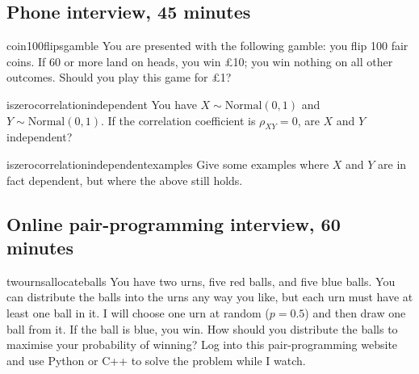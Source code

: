 \documentclass[a4paper]{article}
\begin{document}
\clearpage




\clearpage
\subsection{Phone interview, 45 minutes}
\begin{question}{coin100flipsgamble}
You are presented with the following gamble: you flip 100 fair coins.
If 60 or more land on heads, you win \pounds 10; you win nothing on all other outcomes.
Should you play this game for \pounds 1?
\end{question}

\begin{question}{iszerocorrelationindependent}
You have $X \sim \text{Normal}(0,1)$ and $Y \sim \text{Normal}(0,1)$.
If the correlation coefficient is $\rho_{XY}=0$, are $X$ and $Y$ independent?
\end{question}


\begin{subquestion}{iszerocorrelationindependentexamples}
Give some examples where $X$ and $Y$ are in fact dependent, but where the above still holds.
\end{subquestion}

\clearpage





\clearpage
\subsection{Online pair-programming interview, 60 minutes}
\begin{question}{twournsallocateballs}
You have two urns, five red balls, and five blue balls.
You can distribute the balls into the urns any way you like, but each urn must have at least one ball in it.
I will choose one urn at random ($p=0.5$) and then draw one ball from it.
If the ball is blue, you win.
How should you distribute the balls to maximise your probability of winning?
Log into this pair-programming website and use Python or C++ to solve the problem while I watch.
\end{question}

\clearpage

\end{document}
